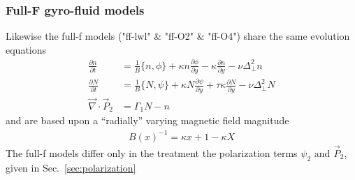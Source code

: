 \subsubsection{Full-F gyro-fluid models}
Likewise the full-f models ("ff-lwl" \& "ff-O2" \& "ff-O4") share the same evolution equations
\begin{subequations}
\begin{align}
 \frac{\partial n}{\partial t}     &= 
    \frac{1}{B}\{ n, \phi\} 
  + \kappa n\frac{\partial \phi}{\partial y} 
  -\kappa \frac{\partial n}{\partial y}
  - \nu \Delta_\perp^2 n  \\
  \frac{\partial N}{\partial t} &=
  \frac{1}{B}\{ N, \psi\} 
  + \kappa N\frac{\partial \psi}{\partial y} 
  + \tau \kappa\frac{\partial N}{\partial y} -\nu \Delta_\perp^2 N \\
   \vec{\nabla}\cdot \vec{P}_2 &= \Gamma_1 N-n
\end{align}
\end{subequations}
and are based upon a ``radially'' varying magnetic field magnitude
\begin{align}
 B(x)^{-1} = \kappa x +1-\kappa X 
\end{align}
The full-f models differ only in the treatment the  polarization terms \(\psi_2\) and \(\vec{P}_2\), given in Sec.~\ref{sec:polarization}
